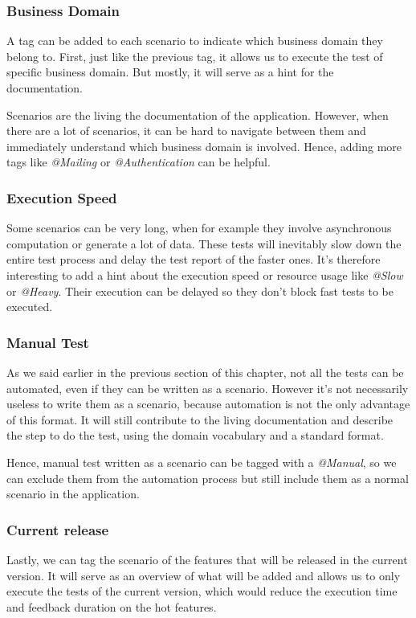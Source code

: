 \subsubsection{Business Domain}
A tag can be added to each scenario to indicate which business domain they
belong to.
First, just like the previous tag, it allows us to execute the test of
specific business domain.
But mostly, it will serve as a hint for the documentation.

Scenarios are the living the documentation of the application.
However, when there are a lot of scenarios, it can be hard to navigate
between them and immediately understand which business domain is involved.
Hence, adding more tags like \textit{@Mailing} or \textit{@Authentication}
can be helpful.

\subsubsection{Execution Speed}
Some scenarios can be very long, when for example they involve asynchronous
computation or generate a lot of data.
These tests will inevitably slow down the entire test process and delay the
test report of the faster ones.
It's therefore interesting to add a hint about the execution speed or
resource usage like \textit{@Slow} or \textit{@Heavy}.
Their execution can be delayed so they don't block fast tests to be executed.

\subsubsection{Manual Test}
As we said earlier in the previous section of this chapter, not all the tests
can be automated, even if they can be written as a scenario.
However it's not necessarily useless to write them as a scenario, because
automation is not the only advantage of this format.
It will still contribute to the living documentation and describe the step to
do the test, using the domain vocabulary and a standard format.

Hence, manual test written as a scenario can be tagged with a
\textit{@Manual}, so we can exclude them from the automation process but
still include them as a normal scenario in the application.

\subsubsection{Current release}
Lastly, we can tag the scenario of the features that will be released in the
current version.
It will serve as an overview of what will be added and allows us to
only execute the tests of the current version, which would reduce the
execution time and feedback duration on the hot features.

